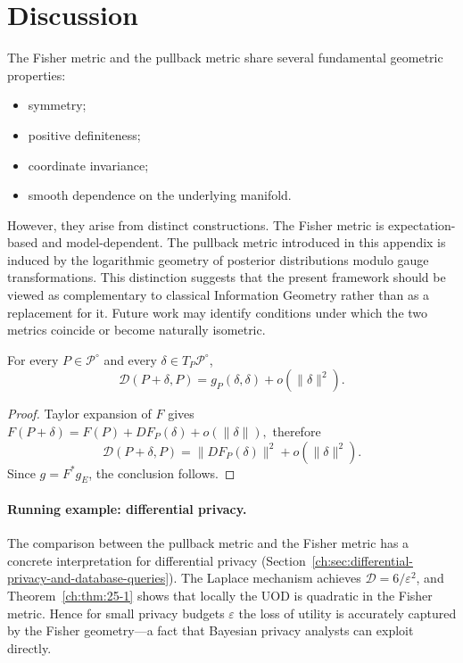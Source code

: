 \section{Discussion}\label{ch:sec:discussion-comparative_geometry}
The Fisher metric and the pullback metric share several fundamental
geometric properties:
\begin{itemize}
\item symmetry;
\item positive definiteness;
\item coordinate invariance;
\item smooth dependence on the underlying manifold.
\end{itemize}
However, they arise from distinct constructions.
The Fisher metric is expectation-based and model-dependent.
The pullback metric introduced in this appendix is induced by the
logarithmic geometry of posterior distributions modulo gauge
transformations.
This distinction suggests that the present framework should be viewed as
complementary to classical Information Geometry rather than as a
replacement for it.
Future work may identify conditions under which the two metrics coincide
or become naturally isometric.

\begin{theorem}\label{ch:thm:25-1}

For every \(P\in\mathcal P^\circ\) and every
\(\delta\in T_P\mathcal P^\circ\),
\[ \mathcal D(P+\delta,P) =
g_P(\delta,\delta) + o(\|\delta\|^2). \]
\end{theorem}
\begin{proof}
Taylor expansion of \(F\) gives
$F(P+\delta)=F(P)+DF_P(\delta)+o(\|\delta\|),$
therefore
\[ \mathcal D(P+\delta,P) =
\|DF_P(\delta)\|^2 + o(\|\delta\|^2). \]
Since \(g=F^{*}g_E\), the conclusion follows. 
\end{proof}

\paragraph{Running example: differential privacy.}
The comparison between the pullback metric and the Fisher metric has a concrete interpretation for differential privacy (Section~\ref{ch:sec:differential-privacy-and-database-queries}).  The Laplace mechanism achieves $\mathcal D=6/\varepsilon^2$, and Theorem~\ref{ch:thm:25-1} shows that locally the UOD is quadratic in the Fisher metric.  Hence for small privacy budgets $\varepsilon$ the loss of utility is accurately captured by the Fisher geometry---a fact that Bayesian privacy analysts can exploit directly.

